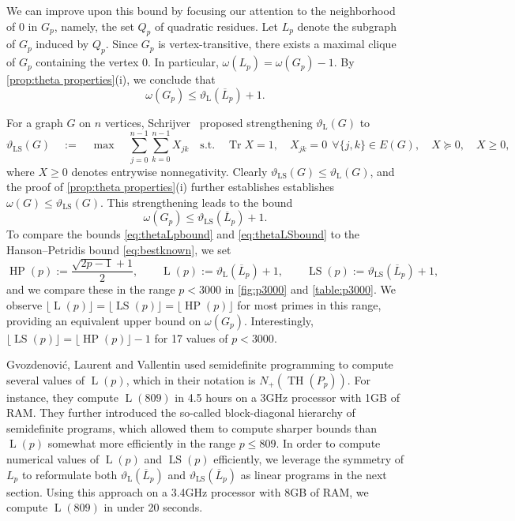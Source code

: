 \documentclass[]{spie}  %
\begin{document}
We can improve upon this bound by focusing our attention to the neighborhood of $0$ in $G_p$, namely, the set $Q_p$ of quadratic residues.  Let $L_p$ denote the subgraph of $G_p$ induced by $Q_p$.  Since $G_p$ is vertex-transitive, there exists a maximal clique of $G_p$ containing the vertex $0$.  In particular, $\omega(L_p) = \omega(G_p) - 1$.  By \cref{prop:theta properties}(i), we conclude that
\begin{equation}\label{eq:thetaLpbound}
\omega(G_p) \leq \vartheta_{\operatorname{L}} (\overline{L}_p) + 1.
\end{equation}


For a graph $G$ on $n$ vertices, Schrijver~\cite{schrijver79} proposed strengthening $\vartheta_{\operatorname{L}}(G)$ to
\[
\vartheta_{\operatorname{LS}}(G)
\quad
:=
\quad
\operatorname{max}  
\quad
\displaystyle \sum_{j = 0}^{n-1} \sum_{k = 0}^{n-1} X_{jk}
\quad
\text{s.t.}
\quad
\operatorname{Tr}X=1,
\quad
X_{jk}=0 ~~\forall\{j,k\}\in E(G),
\quad
X\succeq0,
\quad
X\geq0,
\]
where $X\geq0$ denotes entrywise nonnegativity. Clearly $\vartheta_{\operatorname{LS}}(G) \leq \vartheta_{\operatorname{L}}(G)$, and the proof of \cref{prop:theta properties}(i) further establishes establishes $\omega(G) \leq \vartheta_{\operatorname{LS}}(G)$. This strengthening leads to the bound
\begin{equation}\label{eq:thetaLSbound}
\omega(G_p) \leq \vartheta_{\operatorname{LS}} (\overline{L}_p) + 1.
\end{equation}
To compare the bounds \eqref{eq:thetaLpbound} and \eqref{eq:thetaLSbound} to the Hanson--Petridis bound \eqref{eq:bestknown}, we set
\[
\operatorname{HP}(p) := \dfrac{\sqrt{2p - 1} + 1}{2}, 
\qquad
\operatorname{L}(p) := \vartheta_{\operatorname{L}} (\overline{L}_p) + 1,
\qquad
\operatorname{LS}(p) := \vartheta_{\operatorname{LS}} (\overline{L}_p) + 1,
\]
and we compare these in the range $p < 3000$ in \cref{fig:p3000} and \cref{table:p3000}.    We observe $\lfloor{\operatorname{L}(p)}\rfloor = \lfloor \operatorname{LS}(p) \rfloor = \lfloor \operatorname{HP}(p) \rfloor$ for most primes in this range, providing an equivalent upper bound on $\omega(G_p)$.  Interestingly, $\lfloor \operatorname{LS}(p) \rfloor = \lfloor \operatorname{HP}(p) \rfloor - 1$ for 17 values of $p < 3000$.  

Gvozdenovi\'{c}, Laurent and Vallentin\cite{gvoz09} used semidefinite programming to compute several values of $\operatorname{L}(p)$, which in their notation is $N_+(\operatorname{TH}(P_p))$.  For instance, they compute $\operatorname{L}(809)$ in 4.5 hours on a 3GHz  processor with 1GB of RAM.  They further introduced the so-called block-diagonal hierarchy of semidefinite programs, which allowed them to compute sharper bounds than $\operatorname{L}(p)$ somewhat more efficiently in the range $p \leq 809$.  In order to compute numerical values of $\operatorname{L}(p)$ and $\operatorname{LS}(p)$ efficiently, we leverage the symmetry of $L_p$ to reformulate both $\vartheta_{\operatorname{L}} (\overline{L}_p)$ and $\vartheta_{\operatorname{LS}} (\overline{L}_p)$ as linear programs in the next section.  Using this approach on a 3.4GHz processor with 8GB of RAM, we compute $\operatorname{L}(809)$ in under 20 seconds.
\end{document}
